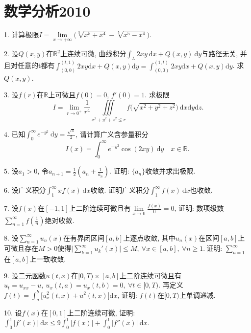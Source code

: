 \documentclass[12pt, a4paper, twoside]{ctexart}%
\newcommand{\rmd}{\mathrm{d}} %
\begin{document}
	\section{数学分析2010}
	1. 计算极限$I=\lim\limits_{x\rightarrow+\infty}\big(\sqrt[5]{x^5+x^4}-\sqrt[5]{x^5-x^4}\big)$.\par
	2. 设$Q(x,y)$在$\mathbb{R}^2$上连续可微, 曲线积分$\int_L2xy\ \rmd x+Q(x,y)\ \rmd y$与路径无关, 并且对任意的t都有$\int_{(0,0)}^{(t,1)}2xy\rmd x+Q(x,y)\rmd y
	=\int_{(0,0)}^{(1,t)}2xy\rmd x+Q(x,y)\rmd y$. 求$Q(x,y)$. \par
	3. 设$f(r)$在$\mathbb{R}$上可微且$f(0)=0$, $f'(0)=1$. 求极限\[\
	I=\lim\limits_{r\rightarrow0^+}\frac{1}{r^4}\iiint\limits_{x^2+y^2+z^2\leq r}f\big(\sqrt{x^2+y^2+z^2}\big)\ \rmd x\rmd y\rmd z.\]\par 
	4. 已知$\int_0^\infty e^{-y^2}\ \rmd y=\frac{\sqrt{\pi}}{2}$, 请计算广义含参量积分\[
	I(x)=\int_0^\infty e^{-y^2}\cos (2xy)\ \rmd y\quad x\in\mathbb{R}.\]\par 
	5. 设$a_1>0$, 令$a_{n+1}=\frac{1}{2}(a_n+\frac{1}{a_n})$. 证明: $\{a_n\}$收敛并求出极限.\par
	6. 设广义积分$\int_1^\infty xf(x)\ \rmd x$收敛. 证明广义积分$\int_1^\infty f(x)\ \rmd x$也收敛.\par
	7. 设$f(x)$在$[-1,1]$上二阶连续可微且有$\lim\limits_{x\rightarrow0}\frac{f(x)}{0}=0$, 证明: 数项级数$\sum\limits_{n=1}^{\infty}f(\frac{1}{n})$绝对收敛. \par
	8. 设$\sum\limits_{n=1}^{\infty}u_n(x)$在有界闭区间$[a,b]$上逐点收敛, 其中$u_n(x)$在区间$[a,b]$上可微且存在$M>0$使得$\Big|\sum\limits_{k=1}^{\infty}u_k'(x)\Big|\leq M,\ \forall x\in[a,b],\ \forall n\ge1.\ $证明: $\sum\limits_{n=1}^\infty$在$[a,b]$上一致收敛. \par
	9. 设二元函数$u(t,x)$在$[0,T)\times[a,b]$上二阶连续可微且有$u_t=u_{xx}-u,\ u_x(t,a)=u_x(t,b)=0,\ \forall t\in[0,T)$. 再定义$f(t)=\int_{a}^{b}\Big[u_x^2(t,x)+u^2(t,x)\Big]\rmd x$, 证明: $f(t)$在$[0,T)$上单调递减.\par
	10. 设$f(x)$在$[0,1]$上二阶连续可微, 证明: $\int_{0}^{1}|f'(x)|\ \rmd x\leq 9\int_{0}^{1}|f(x)|+\int_0^1|f''(x)|\ \rmd x.$\par
	\clearpage
\end{document}
